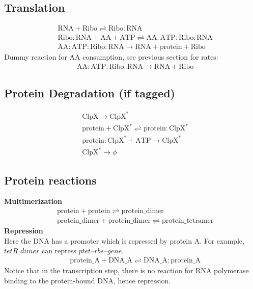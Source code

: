 \documentclass[english]{report}
\begin{document}
\subsection{Translation}

\begin{align}
& \mathrm{RNA} + \mathrm{Ribo} \rightleftharpoons \mathrm{Ribo}\!:\!\mathrm{RNA} \\
& \mathrm{Ribo}\!:\!\mathrm{RNA} + \mathrm{AA} + \mathrm{ATP} \rightleftharpoons \mathrm{AA}\!:\!\mathrm{ATP}\!:\!\mathrm{Ribo}\!:\!\mathrm{RNA} \\
& \mathrm{AA}\!:\!\mathrm{ATP}\!:\!\mathrm{Ribo}\!:\!\mathrm{RNA} \rightarrow \mathrm{RNA} +  \mathrm{protein} + \mathrm{Ribo} 
\end{align}
Dummy reaction for AA consumption, see previous section for rates:\\
\begin{align}
& \mathrm{AA}\!:\!\mathrm{ATP}\!:\!\mathrm{Ribo}\!:\!\mathrm{RNA} \rightarrow \mathrm{RNA} +   \mathrm{Ribo} 
\end{align}

\subsection{Protein Degradation (if tagged)}

\begin{align}
& \mathrm{ClpX}  \rightarrow \mathrm{ClpX^*} \\
& \mathrm{protein} + \mathrm{ClpX^*} \rightleftharpoons \mathrm{protein}\!:\!\mathrm{ClpX^*} \\
& \mathrm{protein}\!:\!\mathrm{ClpX^*} + \mathrm{ATP} \rightarrow \mathrm{ClpX^*} \\
& \mathrm{ClpX^*} \rightarrow \phi
\end{align}

\subsection{Protein reactions}
\textbf{Multimerization}
\begin{align}
& \mathrm{protein} + \mathrm{protein} \rightleftharpoons \mathrm{protein\_dimer} \\
 & \mathrm{protein\_dimer} + \mathrm{protein\_dimer} \rightleftharpoons \mathrm{protein\_tetramer}
\end{align}
\textbf{Repression}\\
Here the DNA has a promoter which is repressed by protein A. For example, $tetR\_dimer$ can repress $ptet\textrm{--}rbs\textrm{--}gene$.
\begin{align}
& \mathrm{protein\_A} + \mathrm{DNA\_A} \rightleftharpoons \mathrm{DNA\_A}\!:\!\mathrm{protein\_A} 
\end{align}
Notice that in the transcription step, there is no reaction for RNA polymerase binding to the protein-bound DNA, hence repression. \\
\end{document}
